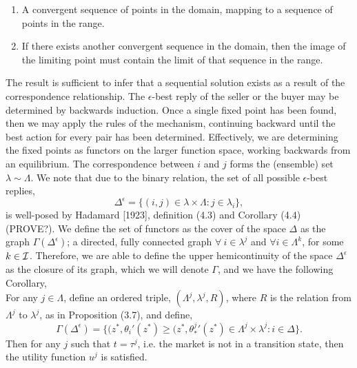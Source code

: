 \begin{enumerate}
    \item\label{co1} A convergent sequence of points in the domain, mapping to a sequence of points in the range.
    \item\label{co2} If there exists another convergent sequence in the domain, then the image of the limiting point must contain the limit of that sequence in the range.
\end{enumerate}                                                                                                                                                                               The result is sufficient to infer that a sequential solution exists as a result of the correspondence relationship. The $\epsilon$-best reply of the seller or the buyer may be determined by backwards induction. Once a single fixed point has been found, then we may apply the rules of the mechanism, continuing backward until the best action for every pair has been determined. Effectively, we are determining the fixed points as functors on the larger function space, working backwards from an equilibrium.
The correspondence between $i$ and $j$ forms the (ensemble) set $\lambda \sim \Lambda$. We note that due to the binary relation, the set of all possible $\epsilon$-best replies,
$$
    \Delta^\epsilon = \lbrace (i, j) \in \lambda \times \Lambda : j \in \lambda_i\rbrace,
$$
is well-posed by Hadamard [1923], definition (4.3) and Corollary (4.4) (PROVE?). %
We define the set of functors as the cover of the space $\Delta$ as the graph $\Gamma(\Delta^{\epsilon})$; a directed, fully connected graph $\forall \ i \in \lambda^j$ and $\forall i\in\Lambda^k$, for some $k\in\mathcal{I}$. Therefore, we are able to define the upper hemicontinuity of the space $\Delta^{\epsilon}$ as the closure of its graph, which we will denote $\Gamma$, and we have the following Corollary,
{
\\
For any $j\in\Lambda$, define an ordered triple, $(\Lambda^j, \lambda^j, R)$, where $R$ is the relation from $\Lambda^j$ to $\lambda^j$, as in Proposition (3.7), and define,
$$
    \Gamma(\Delta^\epsilon) = \big\lbrace (z^*, \theta_i'(z^*)\ge (z^*, \theta_*^j'(z^*) \in \Lambda^j \times \lambda^j : i\in \Delta \big\rbrace.
$$
Then for any $j$ such that $t=\tau^j$, i.e. the market is not in a transition state, then the utility function $u^j$ is satisfied. 
}
